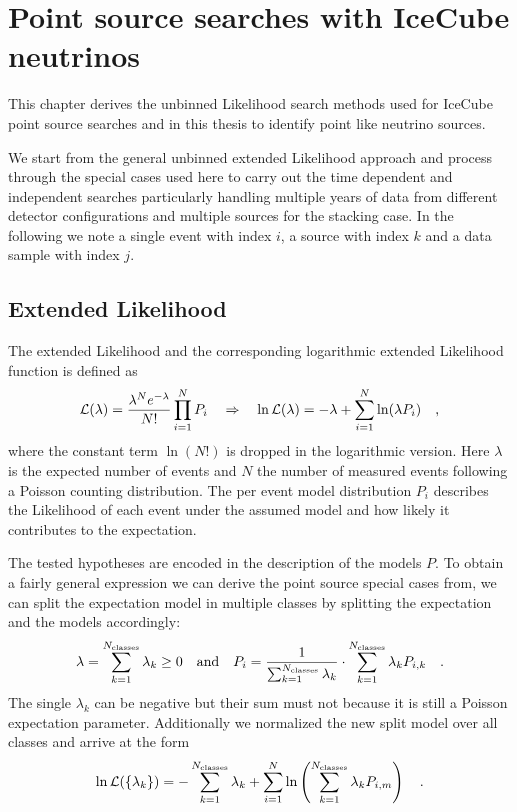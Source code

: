 \chapter{Point source searches with IceCube neutrinos}

This chapter derives the unbinned Likelihood search methods used for IceCube point source searches and in this thesis to identify point like neutrino sources.


We start from the general unbinned extended Likelihood approach and process through the special cases used here to carry out the time dependent and independent searches particularly handling multiple years of data from different detector configurations and multiple sources for the stacking case.
In the following we note a single event with index $i$, a source with index $k$ and a data sample with index $j$.

\section{Extended Likelihood}
The extended Likelihood  and the corresponding logarithmic extended Likelihood function is defined as
\begin{equation}
  \mathcal{L}(\lambda) = \frac{\lambda^N e^{-\lambda}}{N!}\prod_{i=1}^N P_i
  \quad\Rightarrow\quad
    \ln\mathcal{L}(\lambda) = -\lambda+\sum_{i=1}^N \ln(\lambda P_i)
  \quad\text{,}
\end{equation}
where the constant term $\ln(N!)$ is dropped in the logarithmic version.
Here $\lambda$ is the expected number of events and $N$ the number of measured events following a Poisson counting distribution.
The per event model distribution $P_i$ describes the Likelihood of each event under the assumed model and how likely it contributes to the expectation.

The tested hypotheses are encoded in the description of the models $P$.
To obtain a fairly general expression we can derive the point source special cases from, we can split the expectation model in multiple classes by splitting the expectation and the models accordingly:
\begin{equation}
  \lambda = \sum_{k=1}^{N_\text{classes}} \lambda_k \geq 0
  \quad\text{and}\quad
  P_i = \frac{1}{\sum_{k=1}^{N_\text{classes}} \lambda_k}\cdot
         \sum_{k=1}^{N_\text{classes}} \lambda_k P_{i,k}
  \quad\text{.}
\end{equation}
The single $\lambda_k$ can be negative but their sum must not because it is still a Poisson expectation parameter.
Additionally we normalized the new split model over all classes and arrive at the form
\begin{equation}
  \ln\mathcal{L}(\{\lambda_k\})
  = -\sum_{k=1}^{N_\text{classes}} \lambda_k +
    \sum_{i=1}^N \ln\left(\sum_{k=1}^{N_\text{classes}}
      \lambda_k P_{i,m} \right)
  \quad\text{.}
\end{equation}

